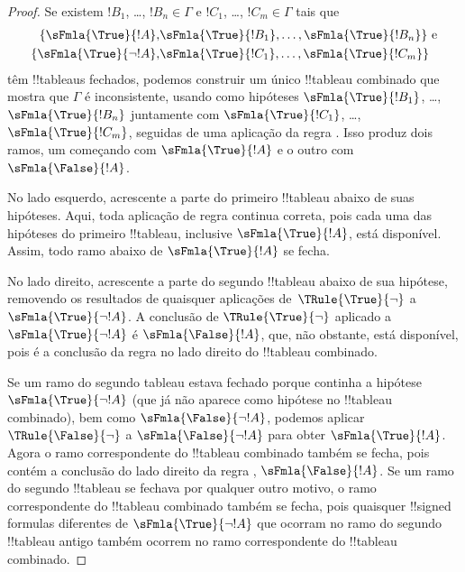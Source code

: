 \documentclass[../../../include/open-logic-section]{subfiles}
\begin{document}
\begin{proof}
  Se existem $!B_1$, \dots, $!B_n \in \Gamma$ e $!C_1$, \dots,
  $!C_m \in \Gamma$ tais que
  \begin{align*}
    \{\sFmla{\True}{!A}, &
    \sFmla{\True}{!B_1}, \dots, \sFmla{\True}{!B_n}\} \text{ e}\\
    \{\sFmla{\True}{\lnot !A}, &
    \sFmla{\True}{!C_1}, \dots, \sFmla{\True}{!C_m}\}
  \end{align*}
  têm !!{tableau}s fechados, podemos construir um único !!{tableau}
  combinado que mostra que $\Gamma$ é inconsistente, usando como hipóteses
  $\sFmla{\True}{!B_1}$, \dots, $\sFmla{\True}{!B_n}$ juntamente com
  $\sFmla{\True}{!C_1}$, \dots, $\sFmla{\True}{!C_m}$, seguidas de uma
  aplicação da regra \Cut{}. Isso produz dois ramos, um começando com
  $\sFmla{\True}{!A}$ e o outro com $\sFmla{\False}{!A}$.  
  
  No lado esquerdo, acrescente a parte do primeiro !!{tableau}
  abaixo de suas hipóteses. Aqui, toda aplicação de regra continua correta,
  pois cada uma das hipóteses do primeiro !!{tableau}, inclusive
  $\sFmla{\True}{!A}$, está disponível. Assim, todo ramo abaixo de
  $\sFmla{\True}{!A}$ se fecha. 
  
  No lado direito, acrescente a parte do segundo !!{tableau} abaixo de sua
  hipótese, removendo os resultados de quaisquer aplicações
  de~$\TRule{\True}{\lnot}$ a $\sFmla{\True}{\lnot !A}$. A conclusão de
  $\TRule{\True}{\lnot}$ aplicado a $\sFmla{\True}{\lnot !A}$ é
  $\sFmla{\False}{!A}$, que, não obstante, está disponível, pois é a
  conclusão da regra \Cut{} no lado direito do !!{tableau} combinado.

  Se um ramo do segundo tableau estava fechado porque continha a hipótese
  $\sFmla{\True}{\lnot !A}$ (que já não aparece como hipótese no
  !!{tableau} combinado), bem como $\sFmla{\False}{\lnot !A}$, podemos
  aplicar $\TRule{\False}{\lnot}$ a $\sFmla{\False}{\lnot !A}$ para obter
  $\sFmla{\True}{!A}$. Agora o ramo correspondente do !!{tableau} combinado
  também se fecha, pois contém a conclusão do lado direito da regra \Cut{},
  $\sFmla{\False}{!A}$. Se um ramo do segundo !!{tableau} se fechava por
  qualquer outro motivo, o ramo correspondente do !!{tableau} combinado
  também se fecha, pois quaisquer !!{signed formula}s diferentes de
  $\sFmla{\True}{\lnot !A}$ que ocorram no ramo do segundo !!{tableau}
  antigo também ocorrem no ramo correspondente do !!{tableau} combinado.
  \end{proof}
\end{document}
